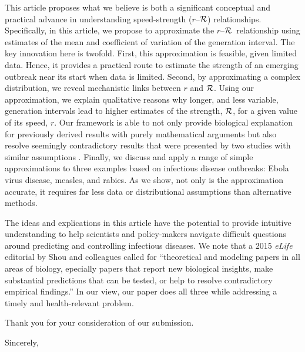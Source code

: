 \documentclass[12pt]{letter}
\newcommand{\rR}{\mbox{$r$--$\cal R$}}
\newcommand{\RR}{\ensuremath{{\cal R}}}
\begin{document}
\begin{letter}{
}
This article proposes what we believe is both a significant conceptual and practical advance in understanding speed-strength (\rR) relationships. Specifically, in this article, we propose to approximate the \rR\ relationship using estimates of the mean and coefficient of variation of the generation interval. The key innovation here is twofold. First, this approximation is feasible, given limited data. Hence, it provides a practical route to estimate the strength of an emerging outbreak near its start when data is limited. Second, by approximating a complex distribution, we reveal mechanistic links between $r$ and \RR. Using our approximation, we explain qualitative reasons why longer, and less variable, generation intervals lead to higher estimates of the strength, \RR, for a given value of its speed, $r$.
Our framework is able to not only provide biological explanation for previously derived results with purely mathematical arguments but also resolve seemingly contradictory results that were presented by two studies with similar assumptions \cite{wearing2005appropriate, roberts2007model}.
Finally, we discuss and apply a range of simple approximations to three examples based on infectious disease outbreaks: Ebola virus disease, measles, and rabies. 
As we show, not only is the approximation accurate, it requires far less data or distributional assumptions than alternative methods.

The ideas and explications in this article have the potential to provide intuitive understanding to help scientists and policy-makers navigate difficult questions around predicting and controlling infectious diseases.
We note that a 2015 \emph{eLife} editorial by Shou and colleagues \cite{shou2015theory} called for ``theoretical and modeling papers in all areas of biology, epecially papers that report new biological insights, make substantial predictions that can be tested, or help to resolve contradictory empirical findings.''
In our view, our paper does all three while addressing a timely and health-relevant problem.

Thank you for your consideration of our submission.

\closing{Sincerely,}



\end{letter}
\end{document}
